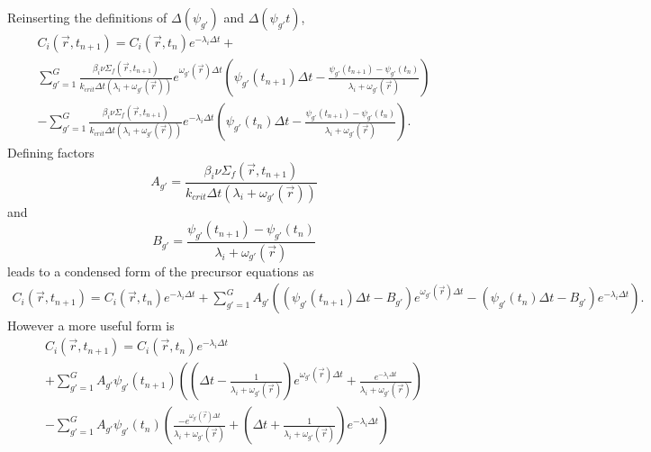 \documentclass[12pt]{report}
\begin{document}
	Reinserting the definitions of $\Delta(\psi_{g'})$ and $\Delta(\psi_{g'}t)$,
	\begin{eqnarray}
	C_i(\vec{r},t_{n+1}) =  C_i(\vec{r},t_{n}) e^{-\lambda_i \Delta t} + \nonumber \\  \sum_{g'=1}^{G} \frac{\beta_i \nu\Sigma_f(\vec{r},t_{n+1})}{k_{crit} \Delta t \left(\lambda_i + \omega_{g'}(\vec{r})\right)} e^{ \omega_{g'}(\vec{r}) \Delta t} \left( \psi_{g'}(t_{n+1}) \Delta t - \frac{\psi_{g'}(t_{n+1})-\psi_{g'}(t_{n})}{\lambda_i + \omega_{g'}(\vec{r})} \right) \nonumber \\ 
	- \sum_{g'=1}^{G} \frac{\beta_i \nu\Sigma_f(\vec{r},t_{n+1})}{k_{crit} \Delta t \left(\lambda_i + \omega_{g'}(\vec{r})\right)} e^{-\lambda_i \Delta t} \left( \psi_{g'}(t_{n}) \Delta t - \frac{\psi_{g'}(t_{n+1})-\psi_{g'}(t_{n})}{\lambda_i + \omega_{g'}(\vec{r})} \right) \nonumber.
	\end{eqnarray}
	Defining factors
	\begin{equation}
	A_{g'} = \frac{\beta_i \nu\Sigma_f(\vec{r},t_{n+1})}{k_{crit} \Delta t \left(\lambda_i + \omega_{g'}(\vec{r})\right)}
	\end{equation}
	and
	\begin{equation}
	B_{g'} = \frac{\psi_{g'}(t_{n+1})-\psi_{g'}(t_{n})}{\lambda_i + \omega_{g'}(\vec{r})}
	\end{equation}
	leads to a condensed form of the precursor equations as
	\begin{eqnarray}
	C_i(\vec{r},t_{n+1}) =  C_i(\vec{r},t_{n}) e^{-\lambda_i \Delta t} +  \sum_{g'=1}^{G} A_{g'} \left( \left( \psi_{g'}(t_{n+1}) \Delta t - B_{g'} \right) e^{ \omega_{g'}(\vec{r}) \Delta t} - 
	\left( \psi_{g'}(t_n) \Delta t - B_{g'} \right) e^{-\lambda_i \Delta t} \right) \nonumber.
	\end{eqnarray}
	However a more useful form is
	\begin{eqnarray}
	C_i(\vec{r},t_{n+1}) =  C_i(\vec{r},t_{n}) e^{-\lambda_i \Delta t} \nonumber \\ 
	+ \sum_{g'=1}^{G} A_{g'} \psi_{g'}(t_{n+1}) \left( \left( \Delta t - \frac{1}{\lambda_i + \omega_{g'}(\vec{r})} \right) e^{\omega_{g'}(\vec{r}) \Delta t} + \frac{e^{-\lambda_i \Delta t}}{\lambda_i + \omega_{g'}(\vec{r})} \right) \nonumber \\
	- \sum_{g'=1}^{G} A_{g'} \psi_{g'}(t_{n}) \left( \frac{-e^{\omega_{g'}(\vec{r}) \Delta t}}{\lambda_i + \omega_{g'}(\vec{r})} + \left(\Delta t + \frac{1}{\lambda_i + \omega_{g'}(\vec{r})} \right)e^{-\lambda_i \Delta t} \right) \nonumber
	\end{eqnarray}
\end{document}
